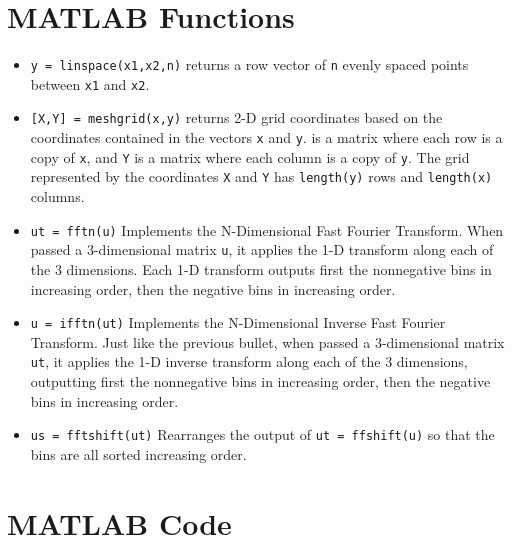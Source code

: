 \documentclass{article}
\begin{document}
\printbibliography

\begin{appendices}

\section{MATLAB Functions}
\begin{itemize}
    \item \texttt{y = linspace(x1,x2,n)} returns a row vector of \texttt{n} evenly spaced points between \texttt{x1} and \texttt{x2}. 
    \item \texttt{[X,Y] = meshgrid(x,y)} returns 2-D grid coordinates based on the coordinates contained in the vectors \texttt{x} and \texttt{y}.  is a matrix where each row is a copy of \texttt{x}, and \texttt{Y} is a matrix where each column is a copy of \texttt{y}. The grid represented by the coordinates \texttt{X} and \texttt{Y} has \texttt{length(y)} rows and \texttt{length(x)} columns.  
    
    \item \texttt{ut = fftn(u)} Implements the N-Dimensional Fast Fourier Transform. When passed a 3-dimensional matrix \texttt{u}, it applies the 1-D transform along each of the 3 dimensions. Each 1-D transform outputs first the nonnegative bins in increasing order, then the negative bins in increasing order.
    
    \item \texttt{u = ifftn(ut)} Implements the N-Dimensional Inverse Fast Fourier Transform. Just like the previous bullet, when passed a 3-dimensional matrix \texttt{ut}, it applies the 1-D inverse transform along each of the 3 dimensions, outputting first the nonnegative bins in increasing order, then the negative bins in increasing order.
    
    \item \texttt{us = fftshift(ut)} Rearranges the output of \texttt{ut = ffshift(u)} so that the bins are all sorted increasing order.
\end{itemize}

\section{MATLAB Code}
\inputminted{matlab}{submarine_hunting.m}

\end{appendices}
\end{document}
